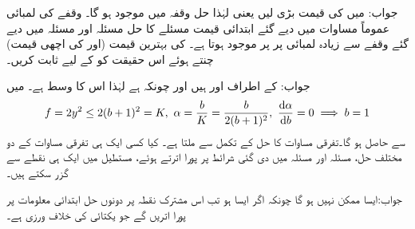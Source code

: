 جواب: میں  کی قیمت بڑی لیں یعنی  لہٰذا حل وقفہ  میں موجود ہو گا۔
\quad {} وقفے کی لمبائی\\
عموماً مساوات  میں دیے گئے ابتدائی قیمت مسئلے کا حل مسئلہ  اور مسئلہ  میں دیے گئے وقفے سے زیادہ لمبائی پر  پر موجود ہوتا ہے۔ کی بہترین قیمت (اور  کی اچھی قیمت) چنتے ہوئے اس حقیقت کو  کے لیے ثابت کریں۔

جواب: کے اطراف  اور  ہیں اور چونکہ  ہے لہٰذا اس  کا وسط  ہے۔ میں
\begin{align*}
f=2y^2\le 2(b+1)^2=K,\,\,\alpha =\frac{b}{K}=\frac{b}{2(b+1)^2},\,\, \frac{\dif \alpha}{\dif b}=0 \implies b=1
\end{align*}
سے  حاصل ہو گا۔تفرقی مساوات کا حل  کے تکمل  سے  ملتا ہے۔
کیا کسی ایک ہی تفرقی مساوات کے دو مختلف حل، مسئلہ  اور مسئلہ  میں دی گئی شرائط پر پورا اترتے ہوئے، مستطیل میں ایک ہی نقطے سے گزر سکتے ہیں۔

جواب:ایسا ممکن نہیں ہو گا چونکہ اگر ایسا ہو تب اس مشترک نقطہ  پر دونوں حل ابتدائی معلومات  پر پورا اتریں گے جو یکتائی کی خلاف ورزی ہے۔
